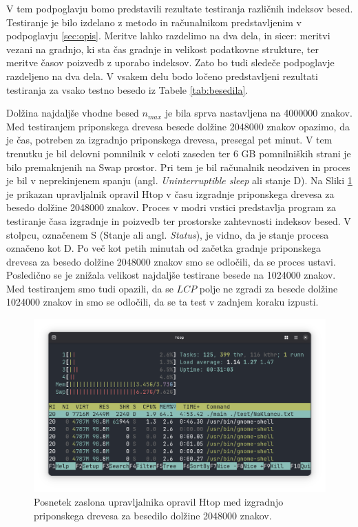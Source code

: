 V tem podpoglavju bomo predstavili rezultate testiranja različnih indeksov besed. Testiranje je bilo izdelano z metodo in računalnikom predstavljenim v podpoglavju \ref{sec:opis}. Meritve lahko razdelimo na dva dela, in sicer: meritvi vezani na gradnjo, ki sta čas gradnje in velikost podatkovne strukture, ter meritve časov poizvedb z uporabo indeksov. Zato bo tudi sledeče podpoglavje razdeljeno na dva dela. V vsakem delu bodo ločeno predstavljeni rezultati testiranja za vsako testno besedo iz Tabele \ref{tab:besedila}.

Dolžina najdaljše vhodne besed $n_{max}$ je bila sprva nastavljena na 4000000 znakov. Med testiranjem priponskega drevesa besede dolžine 2048000 znakov opazimo, da je čas, potreben za izgradnjo priponskega drevesa, presegal pet minut. V tem trenutku je bil delovni pomnilnik v celoti zaseden ter 6 GB pomnilniških strani je bilo premaknjenih na Swap prostor. Pri tem je bil računalnik neodziven in proces je bil v neprekinjenem spanju (angl. \textit{Uninterruptible sleep} ali stanje D). Na Sliki \ref{fig:6GB} je prikazan upravljalnik opravil Htop v času izgradnje priponskega drevesa za besedo dolžine 2048000 znakov. Proces v modri vrstici predstavlja program za testiranje časa izgradnje in poizvedb ter prostorske zahtevnosti indeksov besed. V stolpcu, označenem S (Stanje ali angl. \textit{Status}), je vidno, da je stanje procesa označeno kot D. Po več kot petih minutah od začetka gradnje priponskega drevesa za besedo dolžine 2048000 znakov smo se odločili, da se proces ustavi. Posledično se je znižala velikost najdaljše testirane besede na 1024000 znakov. Med testiranjem smo tudi opazili, da se $LCP$ polje ne zgradi za besede dolžine 1024000 znakov in smo se odločili, da se ta test v zadnjem koraku izpusti.

\begin{figure}[tb]
    \centering
    \includegraphics[width=\textwidth]{Slike/Zaslonski posnetek 2025-06-23 22-53-56.png}

    \caption{Posnetek zaslona upravljalnika opravil Htop med izgradnjo priponskega drevesa za besedilo dolžine 2048000 znakov.} 
    \label{fig:6GB}
\end{figure}


